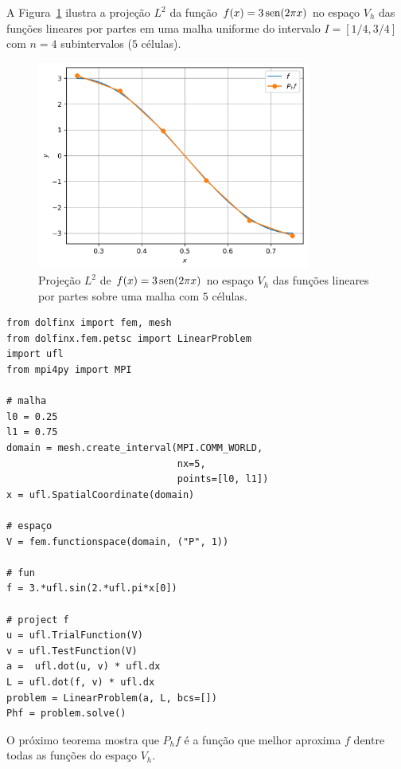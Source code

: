 \begin{ex}\label{ex:mef1d_proj}
  A Figura~\ref{fig:ex_mef1d_proj} ilustra a projeção $L^2$ da função $f(x)=3\operatorname{sen}(2\pi x)$ no espaço $V_h$ das funções lineares por partes em uma malha uniforme do intervalo $I=[1/4, 3/4]$ com $n=4$ subintervalos ($5$ células).

  \begin{figure}[h!]
    \centering
    \includegraphics[width=0.8\textwidth]{./cap_mef1d/dados/ex_mef1d_proj/fig}
    \caption{Projeção $L^2$ de $f(x)=3\operatorname{sen}(2\pi x)$ no espaço $V_h$ das funções lineares por partes sobre uma malha com $5$ células.}
    \label{fig:ex_mef1d_proj}
  \end{figure}

\begin{lstlisting}[caption=ex\_mef1d\_proj.py]
from dolfinx import fem, mesh
from dolfinx.fem.petsc import LinearProblem
import ufl
from mpi4py import MPI

# malha
l0 = 0.25
l1 = 0.75
domain = mesh.create_interval(MPI.COMM_WORLD,
                              nx=5,
                              points=[l0, l1])
x = ufl.SpatialCoordinate(domain)

# espaço
V = fem.functionspace(domain, ("P", 1))

# fun
f = 3.*ufl.sin(2.*ufl.pi*x[0])

# project f
u = ufl.TrialFunction(V)
v = ufl.TestFunction(V)
a =  ufl.dot(u, v) * ufl.dx
L = ufl.dot(f, v) * ufl.dx
problem = LinearProblem(a, L, bcs=[])
Phf = problem.solve()
\end{lstlisting}
\end{ex}

O próximo teorema mostra que $P_h f$ é a função que melhor aproxima $f$ dentre todas as funções do espaço $V_h$.

